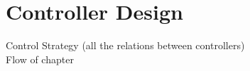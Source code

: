\chapter{Controller Design}\label{chap:Control}

Control Strategy (all the relations between controllers)\\
Flow of chapter\\